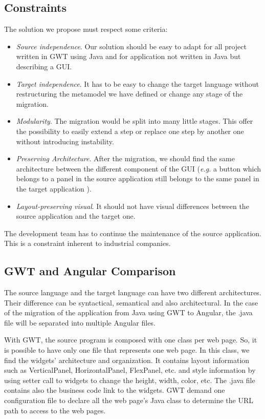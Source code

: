 \documentclass[conference]{IEEEtran}
\begin{document}
    \subsection{Constraints}
    
    The solution we propose must respect some criteria:
    \begin{itemize}
        \item \emph{Source independence}. Our solution should be easy to adapt
            for all project written in GWT using Java and for
            application not written in Java but describing a GUI.
        \item \emph{Target independence}. It has to be easy to change the target
            language without restructuring the metamodel we have defined or 
            change any stage of the migration.
        \item \emph{Modularity}. The migration would be split into many little
            stages. This offer the possibility to easily extend a step or 
            replace one step by another one without introducing instability. 
        \item \emph{Preserving Architecture}. After the migration, we should find
            the same architecture between the different component of the GUI (\emph{e.g.}
            a button which belongs to a panel in the source application still belongs to the same panel in the target application ).
        \item \emph{Layout-preserving visual}. It should not have visual differences
            between the source application and the target one.
    \end{itemize}
    
    The development team has to continue the maintenance of the source application.
    This is a constraint inherent to industrial companies.
    
    \subsection{GWT and Angular Comparison}
    The source language and the target language can have two different architectures.
    Their difference can be syntactical, semantical and also architectural. %
    In the case of the migration of the application from Java using GWT to Angular, 
        the .java file will be separated into multiple Angular files.
    
    With GWT, the source program is composed with one class per web page.
    So, it is possible to have only one file that represents one web page.
    In this class, we find the widgets' architecture and organization.
    It contains layout information such as VerticalPanel, HorizontalPanel, FlexPanel, etc.
        and style information by using setter call to widgets to change the height, width, color, etc.
    The .java file contains also the business code link to the widgets.
    GWT demand one configuration file to declare all the web page's Java class to
        determine the URL path to access to the web pages.
    
\end{document}

